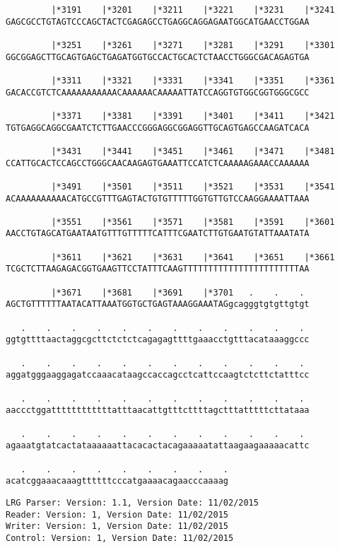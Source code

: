 \documentclass{article}
\begin{document}
\begin{Verbatim}
         |*3191    |*3201    |*3211    |*3221    |*3231    |*3241
GAGCGCCTGTAGTCCCAGCTACTCGAGAGCCTGAGGCAGGAGAATGGCATGAACCTGGAA
  
         |*3251    |*3261    |*3271    |*3281    |*3291    |*3301
GGCGGAGCTTGCAGTGAGCTGAGATGGTGCCACTGCACTCTAACCTGGGCGACAGAGTGA
  
         |*3311    |*3321    |*3331    |*3341    |*3351    |*3361
GACACCGTCTCAAAAAAAAAAACAAAAAACAAAAATTATCCAGGTGTGGCGGTGGGCGCC
  
         |*3371    |*3381    |*3391    |*3401    |*3411    |*3421
TGTGAGGCAGGCGAATCTCTTGAACCCGGGAGGCGGAGGTTGCAGTGAGCCAAGATCACA
  
         |*3431    |*3441    |*3451    |*3461    |*3471    |*3481
CCATTGCACTCCAGCCTGGGCAACAAGAGTGAAATTCCATCTCAAAAAGAAACCAAAAAA
  
         |*3491    |*3501    |*3511    |*3521    |*3531    |*3541
ACAAAAAAAAAACATGCCGTTTGAGTACTGTGTTTTTGGTGTTGTCCAAGGAAAATTAAA
  
         |*3551    |*3561    |*3571    |*3581    |*3591    |*3601
AACCTGTAGCATGAATAATGTTTGTTTTTCATTTCGAATCTTGTGAATGTATTAAATATA
  
         |*3611    |*3621    |*3631    |*3641    |*3651    |*3661
TCGCTCTTAAGAGACGGTGAAGTTCCTATTTCAAGTTTTTTTTTTTTTTTTTTTTTTTAA
  
         |*3671    |*3681    |*3691    |*3701   .    .    . 
AGCTGTTTTTTAATACATTAAATGGTGCTGAGTAAAGGAAATAGgcagggtgtgttgtgt
  
   .    .    .    .    .    .    .    .    .    .    .    . 
ggtgttttaactaggcgcttctctctcagagagttttgaaacctgtttacataaaggccc
  
   .    .    .    .    .    .    .    .    .    .    .    . 
aggatgggaaggagatccaaacataagccaccagcctcattccaagtctcttctatttcc
  
   .    .    .    .    .    .    .    .    .    .    .    . 
aaccctggattttttttttttatttaacattgtttcttttagctttatttttcttataaa
  
   .    .    .    .    .    .    .    .    .    .    .    . 
agaaatgtatcactataaaaaattacacactacagaaaaatattaagaagaaaaacattc
  
   .    .    .    .    .    .    .    .    .
acatcggaaacaaagttttttcccatgaaaacagaacccaaaag
\end{Verbatim}
\newpage
\begin{Verbatim}
LRG Parser: Version: 1.1, Version Date: 11/02/2015
Reader: Version: 1, Version Date: 11/02/2015
Writer: Version: 1, Version Date: 11/02/2015
Control: Version: 1, Version Date: 11/02/2015
\end{Verbatim}
\end{document}
